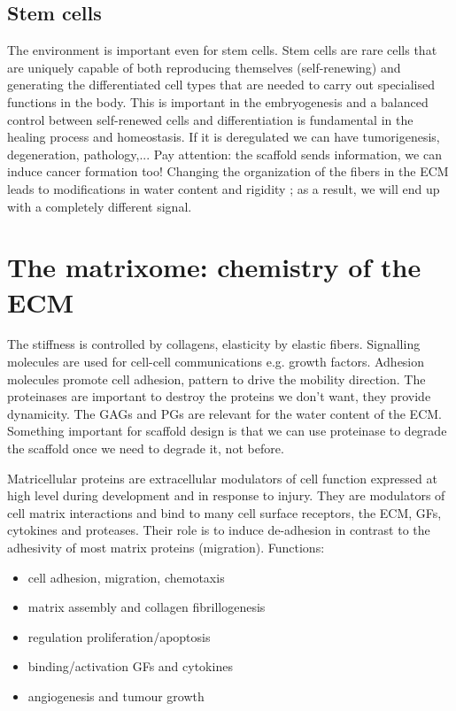 \subsection{Stem cells}
The environment is important even for stem cells. Stem cells are rare cells that are uniquely capable of both reproducing themselves (self-renewing) and generating the differentiated cell types that are needed to carry out specialised functions in the body.
This is important in the embryogenesis and a balanced control between self-renewed cells and differentiation is fundamental in the healing process and homeostasis. If it is deregulated we can have tumorigenesis, degeneration, pathology,...
Pay attention: the scaffold sends information, we can induce cancer formation too!
Changing the organization of the fibers in the ECM leads to modifications in water content and rigidity ; as a result, we will end up with a completely different signal.

\section{The matrixome: chemistry of the ECM}
The stiffness is controlled by collagens, elasticity by elastic fibers.
Signalling molecules are used for cell-cell communications e.g. growth factors.
Adhesion molecules promote cell adhesion, pattern to drive the mobility direction.
The proteinases are important to destroy the proteins we don’t want, they provide dynamicity. The GAGs and PGs are relevant for the water content of the ECM.
Something important for scaffold design is that we can use proteinase to degrade the scaffold once we need to degrade it, not before.

Matricellular proteins are extracellular modulators of cell function expressed at high level during development and in response to injury. They are modulators of cell matrix interactions and bind to many cell surface receptors, the ECM, GFs, cytokines and proteases. Their role is to induce de-adhesion in contrast to the adhesivity of most matrix proteins (migration).
\noindent
Functions:
\begin{itemize}
\item cell adhesion, migration, chemotaxis
\item matrix assembly and collagen fibrillogenesis
\item regulation proliferation/apoptosis
\item binding/activation GFs and cytokines
\item angiogenesis and tumour growth
\end{itemize}

